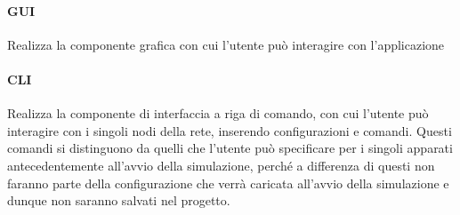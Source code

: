 \paragraph*{GUI} Realizza la componente grafica con cui l'utente può interagire con l'applicazione
\paragraph*{CLI} Realizza la componente di interfaccia a riga di comando, con cui l'utente può interagire con i singoli nodi della rete, inserendo configurazioni e comandi. Questi comandi si distinguono da quelli che l'utente può specificare per i singoli apparati antecedentemente all'avvio della simulazione, perché a differenza di questi non faranno parte della configurazione che verrà caricata all'avvio della simulazione e dunque non saranno salvati nel progetto.


\newpage